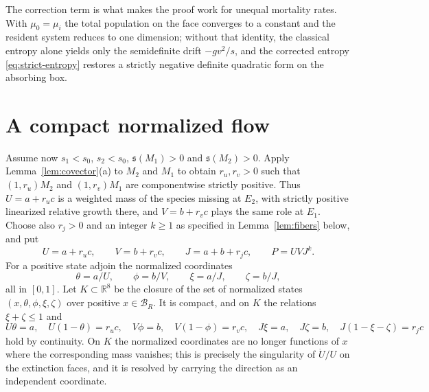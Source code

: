 \documentclass[11pt,a4paper]{article}
\theoremstyle{plain}
\theoremstyle{definition}
\theoremstyle{remark}
\newcommand{\R}{\mathbb R}
\newcommand{\spb}{\mathfrak s}
\newcommand{\cB}{\mathcal B}
\begin{document}
The correction term is what makes the proof work for unequal mortality rates. With $\mu_0=\mu_i$ the total population on the face converges to a constant and the resident system reduces to one dimension; without that identity, the classical entropy alone yields only the semidefinite drift $-gv^2/s$, and the corrected entropy \eqref{eq:strict-entropy} restores a strictly negative definite quadratic form on the absorbing box.

\section{A compact normalized flow}\label{sec:lift}

Assume now $s_1<s_0$, $s_2<s_0$, $\spb(M_1)>0$ and $\spb(M_2)>0$. Apply Lemma~\ref{lem:covector}(a) to $M_2$ and $M_1$ to obtain $r_u,r_v>0$ such that $(1,r_u)M_2$ and $(1,r_v)M_1$ are componentwise strictly positive. Thus $U=a+r_uc$ is a weighted mass of the species missing at $E_2$, with strictly positive linearized relative growth there, and $V=b+r_vc$ plays the same role at $E_1$. Choose also $r_j>0$ and an integer $k\ge1$ as specified in Lemma~\ref{lem:fibers} below, and put
\begin{equation}\label{eq:masses}
 U=a+r_uc,\qquad V=b+r_vc,\qquad J=a+b+r_jc,\qquad P=UVJ^k.
\end{equation}
For a positive state adjoin the normalized coordinates
\begin{equation}\label{eq:directions}
 \theta=a/U,\qquad \phi=b/V,\qquad \xi=a/J,\qquad \zeta=b/J,
\end{equation}
all in $[0,1]$. Let $K\subset\R^8$ be the closure of the set of normalized states $(x,\theta,\phi,\xi,\zeta)$ over positive $x\in\cB_R$. It is compact, and on $K$ the relations $\xi+\zeta\le1$ and
\begin{equation}\label{eq:mass-identities}
 U\theta=a,\quad U(1-\theta)=r_uc,\quad V\phi=b,\quad V(1-\phi)=r_vc,\quad J\xi=a,\quad J\zeta=b,\quad J(1-\xi-\zeta)=r_jc
\end{equation}
hold by continuity. On $K$ the normalized coordinates are no longer functions of $x$ where the corresponding mass vanishes; this is precisely the singularity of $\dot U/U$ on the extinction faces, and it is resolved by carrying the direction as an independent coordinate.
\end{document}
